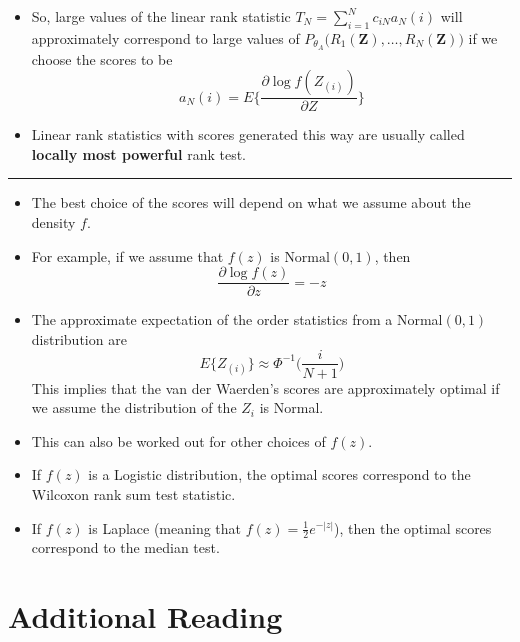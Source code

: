 \documentclass[]{book}
\begin{document}
\begin{itemize}
\item
  So, large values of the linear rank statistic \(T_{N} = \sum_{i=1}^{N} c_{iN} a_{N}(i)\) will approximately
  correspond to large values of \(P_{\theta_{A}}\Big( R_{1}(\mathbf{Z}), \ldots, R_{N}(\mathbf{Z}) \Big)\)
  if we choose the scores to be
  \begin{equation}
  a_{N}(i) = E\Bigg\{ \frac{\partial \log f(Z_{(i)})}{ \partial Z}  \Bigg\}
  \end{equation}
\item
  Linear rank statistics with scores generated this way are usually called
  \textbf{locally most powerful} rank test.
\end{itemize}

\begin{center}\rule{0.5\linewidth}{\linethickness}\end{center}

\begin{itemize}
\item
  The best choice of the scores will depend on what we assume about the density \(f\).
\item
  For example, if we assume that \(f(z)\) is \(\textrm{Normal}(0,1)\), then
  \begin{equation}
  \frac{\partial \log f(z)}{\partial z} = -z
  \end{equation}
\item
  The approximate expectation of the order statistics from a Normal\((0,1)\) distribution are
  \begin{equation}
  E\{ Z_{(i)} \} \approx \Phi^{-1}\Bigg( \frac{i}{N+1} \Bigg)
  \end{equation}
  This implies that the van der Waerden's scores are approximately optimal
  if we assume the distribution of the \(Z_{i}\) is Normal.
\item
  This can also be worked out for other choices of \(f(z)\).
\item
  If \(f(z)\) is a Logistic distribution, the optimal scores correspond to the Wilcoxon rank sum test statistic.
\item
  If \(f(z)\) is Laplace (meaning that \(f(z) = \frac{1}{2}e^{-|z|}\)), then the optimal scores
  correspond to the median test.
\end{itemize}

\hypertarget{additional-reading}{%
\section{Additional Reading}\label{additional-reading}}
\end{document}
